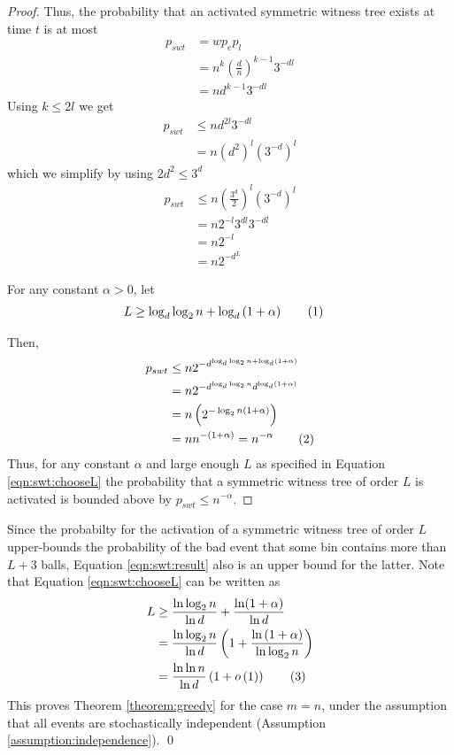 \documentclass[a4paper,12pt]{article}
\newcommand\numberthis{\addtocounter{equation}{1}\tag{\theequation}}
\newcommand\neqn[1]{\numberthis\label{eqn:#1}}
\begin{document}
\begin{proof}
Thus, the probability that an activated symmetric witness tree exists at time $t$ is at most 
\begin{align*}
p_{swt} &= w  p_e  p_l \\
		&= n^{k}  \left(\frac{d}{n}\right)^{k-1}  3^{-d  l} \\
		&= n  d^{k-1}  3^{-d  l}
\end{align*}
Using $k \leq 2l$ we get
\begin{align*}
p_{swt} &\leq n  d^{2 l}  3^{-d  l} \\
		&= n  \left(d^2\right)^l  \left( 3^{-d} \right)^l
\end{align*}
which we simplify by using $2d^2 \leq 3^d$
\begin{align*}
p_{swt} &\leq n  \left(\frac{3^d}{2}\right)^l  \left( 3^{-d}\right)^l \\
		&= n  2^{-l}  3^{d l}  3^{-d  l} \\
		&= n 2^{-l}		\\
		&= n 2^{-d^L}		
\end{align*}

For any constant $\alpha > 0 $, let
\begin{align*}
L &\geq \log_d\log_2 n + \log_d\left(1+\alpha\right) \neqn{swt:chooseL}
\end{align*}

Then, 
\begin{align*}
p_{swt} &\leq n  2^{{-d}^{\log_d\log_2 n + \log_d\left(1+\alpha\right)}} \\
		&= n  2^{-{d}^{\log_d\log_2 n} d^{\log_d \left(1+\alpha\right)}} \\
		&= n  \left( 2^{-\log_2 n  \left(1+ \alpha \right)} \right) \\
		&= n  n^{-\left(1+\alpha\right)} = n^{-\alpha} \neqn{swt:result}
\end{align*}
Thus, for any constant $\alpha$ and large enough $L$ as specified in Equation \ref{eqn:swt:chooseL} the probability that a symmetric witness tree of order $L$ is activated is bounded above by $p_{swt }\leq n^{-\alpha}$.
\end{proof}

Since the probabilty for the activation of a symmetric witness tree of order $L$ upper-bounds the probability of the bad event that some bin contains more than $L+3$ balls, Equation \ref{eqn:swt:result} also is an upper bound for the latter. Note that Equation \ref{eqn:swt:chooseL} can be written as
\begin{align*}
L &\geq  \frac{\ln\log_2 n}{\ln d} + \frac{\ln(1+\alpha)}{\ln d} \\
   &= \frac{\ln \log_2 n}{\ln d}  \left(1 + \frac{\ln\left(1+\alpha\right)}{\ln \log_2 n}\right) \\
  &=  \frac{\ln \ln n}{\ln d}  \left( 1+ o\left( 1\right)\right) \neqn{swt:boundL}
\end{align*}
This proves Theorem \ref{theorem:greedy} for the case $m=n$, under the assumption that all events are stochastically independent (Assumption \ref{assumption:independence}). \qed
\end{document}
